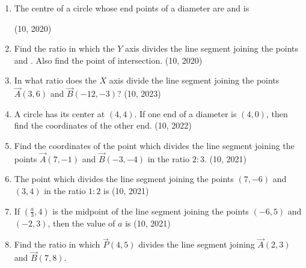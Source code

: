 \begin{enumerate}[label=\thesubsection.\arabic*,ref=\thesubsection.\theenumi]
\item The centre of a circle whose end points of a diameter are  and  is

\hfill (10, 2020)
\item Find the ratio in which the $Y$ axis  divides the line segment joining the points  and . Also find the point of intersection.
\hfill (10, 2020)
    \item In what ratio does the $X$ axis divide the line segment joining the points $\vec{A}(3,6)$ and $\vec{B}(-12, -3)$?
    \hfill (10, 2023)
    \item A circle has its center at $(4,4)$. If one end of a diameter is $(4,0)$, then find the coordinates of the other end.
    \hfill (10, 2022)
	\item Find the coordinates of the point which divides the line segment joining the points $\vec{A}(7, -1)$ and $\vec{B}(-3, -4)$ in the ratio $2:3$. \hfill (10, 2021)
		\item The point which divides the line segment joining the points $(7, -6)$ and $(3, 4)$ in the ratio $1:2$ is
		\hfill (10, 2021)
		\item If $\left(\frac{a}{3}, 4\right)$ is the midpoint of the line segment joining the points $(-6, 5)$ and $(-2, 3)$, then the value of $a$ is
		\hfill (10, 2021)
		\item Find the ratio in which $\vec{P}(4, 5)$ divides the line segment joining $\vec{A}(2, 3)$ and $\vec{B}(7, 8)$.


\end{enumerate}
